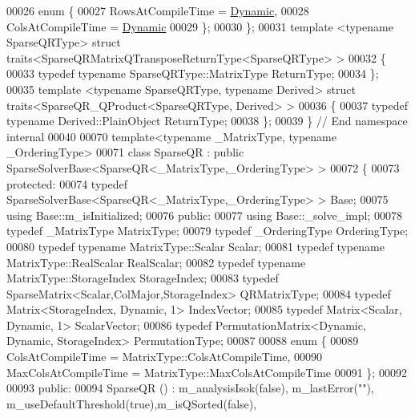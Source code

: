 \begin{DoxyCode}
00026     \textcolor{keyword}{enum} \{
00027       RowsAtCompileTime = \hyperlink{namespace_eigen_ad81fa7195215a0ce30017dfac309f0b2}{Dynamic},
00028       ColsAtCompileTime = \hyperlink{namespace_eigen_ad81fa7195215a0ce30017dfac309f0b2}{Dynamic}
00029     \};
00030   \};
00031   \textcolor{keyword}{template} <\textcolor{keyword}{typename} SparseQRType> \textcolor{keyword}{struct }traits<SparseQRMatrixQTransposeReturnType<SparseQRType> >
00032   \{
00033     \textcolor{keyword}{typedef} \textcolor{keyword}{typename} SparseQRType::MatrixType ReturnType;
00034   \};
00035   \textcolor{keyword}{template} <\textcolor{keyword}{typename} SparseQRType, \textcolor{keyword}{typename} Derived> \textcolor{keyword}{struct }traits<SparseQR\_QProduct<SparseQRType, Derived>
       >
00036   \{
00037     \textcolor{keyword}{typedef} \textcolor{keyword}{typename} Derived::PlainObject ReturnType;
00038   \};
00039 \} \textcolor{comment}{// End namespace internal}
00040 
00070 \textcolor{keyword}{template}<\textcolor{keyword}{typename} \_MatrixType, \textcolor{keyword}{typename} \_OrderingType>
00071 \textcolor{keyword}{class }SparseQR : \textcolor{keyword}{public} SparseSolverBase<SparseQR<\_MatrixType,\_OrderingType> >
00072 \{
00073   \textcolor{keyword}{protected}:
00074     \textcolor{keyword}{typedef} SparseSolverBase<SparseQR<\_MatrixType,\_OrderingType> > Base;
00075     \textcolor{keyword}{using} Base::m\_isInitialized;
00076   \textcolor{keyword}{public}:
00077     \textcolor{keyword}{using} Base::\_solve\_impl;
00078     \textcolor{keyword}{typedef} \_MatrixType MatrixType;
00079     \textcolor{keyword}{typedef} \_OrderingType OrderingType;
00080     \textcolor{keyword}{typedef} \textcolor{keyword}{typename} MatrixType::Scalar Scalar;
00081     \textcolor{keyword}{typedef} \textcolor{keyword}{typename} MatrixType::RealScalar RealScalar;
00082     \textcolor{keyword}{typedef} \textcolor{keyword}{typename} MatrixType::StorageIndex StorageIndex;
00083     \textcolor{keyword}{typedef} SparseMatrix<Scalar,ColMajor,StorageIndex> QRMatrixType;
00084     \textcolor{keyword}{typedef} Matrix<StorageIndex, Dynamic, 1> IndexVector;
00085     \textcolor{keyword}{typedef} Matrix<Scalar, Dynamic, 1> ScalarVector;
00086     \textcolor{keyword}{typedef} PermutationMatrix<Dynamic, Dynamic, StorageIndex> PermutationType;
00087 
00088     \textcolor{keyword}{enum} \{
00089       ColsAtCompileTime = MatrixType::ColsAtCompileTime,
00090       MaxColsAtCompileTime = MatrixType::MaxColsAtCompileTime
00091     \};
00092     
00093   \textcolor{keyword}{public}:
00094     SparseQR () :  m\_analysisIsok(false), m\_lastError(\textcolor{stringliteral}{""}), m\_useDefaultThreshold(true),m\_isQSorted(false),

\end{DoxyCode}
